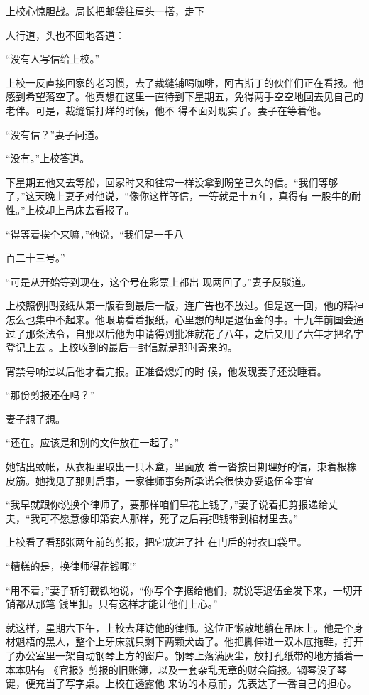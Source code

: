 \documentclass{article}
\begin{document}
上校心惊胆战。局长把邮袋往肩头一搭，走下
\newpage

人行道，头也不回地答道： 


“没有人写信给上校。” 

上校一反直接回家的老习惯，去了裁缝铺喝咖啡，阿古斯丁的伙伴们正在看报。他感到希望落空了。他真想在这里一直待到下星期五，免得两手空空地回去见自己的老伴。可是，裁缝铺打烊的时候，他不
得不面对现实了。妻子在等着他。 


“没有信？”妻子问道。 


“没有。”上校答道。 

下星期五他又去等船，回家时又和往常一样没拿到盼望已久的信。“我们等够了，”这天晚上妻子对他说，“像你这样等信，一等就是十五年，真得有
一股牛的耐性。”上校却上吊床去看报了。 

“得等着挨个来嘛，”他说，“我们是一千八

\newpage
百二十三号。” 

“可是从开始等到现在，这个号在彩票上都出
现两回了。”妻子反驳道。 

上校照例把报纸从第一版看到最后一版，连广告也不放过。但是这一回，他的精神怎么也集中不起来。他眼睛看着报纸，心里想的却是退伍金的事。十九年前国会通过了那条法令，自那以后他为申请得到批准就花了八年，之后又用了六年才把名字登记上去
。上校收到的最后一封信就是那时寄来的。 

宵禁号响过以后他才看完报。正准备熄灯的时
候，他发现妻子还没睡着。 


“那份剪报还在吗？” 


妻子想了想。 


“还在。应该是和别的文件放在一起了。” 

她钻出蚊帐，从衣柜里取出一只木盒，里面放
\newpage
着一沓按日期理好的信，束着根橡皮筋。她找见了那则启事，一家律师事务所承诺会很快办妥退伍金事宜

“我早就跟你说换个律师了，要那样咱们早花上钱了，”妻子说着把剪报递给丈夫，“我可不愿意像印第安人那样，死了之后再把钱带到棺材里去。”

上校看了看那张两年前的剪报，把它放进了挂
在门后的衬衣口袋里。 


“糟糕的是，换律师得花钱哪!” 

“用不着，”妻子斩钉截铁地说，“你写个字据给他们，就说等退伍金发下来，一切开销都从那笔
钱里扣。只有这样才能让他们上心。” 

就这样，星期六下午，上校去拜访他的律师。这位正懶散地躺在吊床上。他是个身材魁梧的黑人，整个上牙床就只剩下两颗犬齿了。他把脚伸进一双木底拖鞋，打开了办公室里一架自动钢琴上方的窗户。钢琴上落满灰尘，放打孔纸带的地方插着一本本贴有
\newpage
《官报》剪报的旧账簿，以及一套杂乱无章的财会简报。钢琴没了琴键，便充当了写字桌。上校在透露他
来访的本意前，先表达了一番自己的担心。 
\end{document}
